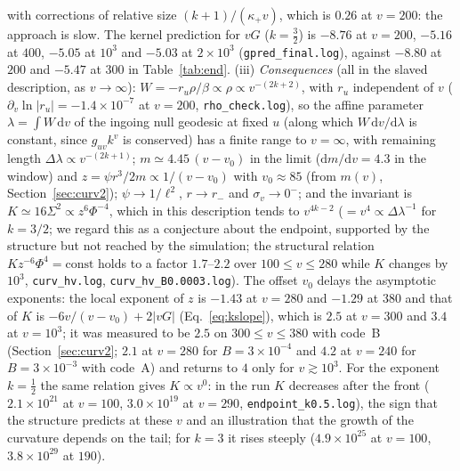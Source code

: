 \documentclass[11pt]{article}
\begin{document}
with corrections of relative size $(k+1)/(\kappa_+v)$, which is $0.26$ at $v=200$: the approach is slow. The kernel prediction for $vG$ ($k=\tfrac32$) is $-8.76$ at $v=200$, $-5.16$ at $400$, $-5.05$ at $10^{3}$ and $-5.03$ at $2\times10^{3}$ (\texttt{gpred\_final.log}), against $-8.80$ at $200$ and $-5.47$ at $300$ in Table~\ref{tab:end}. (iii) \emph{Consequences} (all in the slaved description, as $v\to\infty$): $W=-r_u\rho/\beta\propto\rho\propto v^{-(2k+2)}$, with $r_u$ independent of $v$ ($\partial_v\ln|r_u|=-1.4\times10^{-7}$ at $v=200$, \texttt{rho\_check.log}), so the affine parameter $\lambda=\int W\,\mathrm{d}v$ of the ingoing null geodesic at fixed $u$ (along which $W\,\mathrm{d}v/\mathrm{d}\lambda$ is constant, since $g_{uv}k^{v}$ is conserved) has a finite range to $v=\infty$, with remaining length $\Delta\lambda\propto v^{-(2k+1)}$; $m\simeq4.45\,(v-v_0)$ in the limit ($\mathrm{d}m/\mathrm{d}v=4.3$ in the window) and $z=\psi r^{3}/2m\propto1/(v-v_0)$ with $v_0\approx85$ (from $m(v)$, Section~\ref{sec:curv2}); $\psi\to1/\ell^{2}$, $r\to r_-$ and $\sigma_v\to0^{-}$; and the invariant is $K\simeq16\Sigma^{2}\propto z^{6}\Phi^{-4}$, which in this description tends to $v^{4k-2}$ ($=v^{4}\propto\Delta\lambda^{-1}$ for $k=3/2$; we regard this as a conjecture about the endpoint, supported by the structure but not reached by the simulation; the structural relation $Kz^{-6}\Phi^{4}=\mathrm{const}$ holds to a factor $1.7$--$2.2$ over $100\le v\le280$ while $K$ changes by $10^{3}$, \texttt{curv\_hv.log}, \texttt{curv\_hv\_B0.0003.log}). The offset $v_0$ delays the asymptotic exponents: the local exponent of $z$ is $-1.43$ at $v=280$ and $-1.29$ at $380$ and that of $K$ is $-6v/(v-v_0)+2|vG|$ (Eq.~\eqref{eq:kslope}), which is $2.5$ at $v=300$ and $3.4$ at $v=10^{3}$; it was measured to be $2.5$ on $300\le v\le380$ with code~B (Section~\ref{sec:curv2}; $2.1$ at $v=280$ for $B=3\times10^{-4}$ and $4.2$ at $v=240$ for $B=3\times10^{-3}$ with code~A) and returns to $4$ only for $v\gtrsim10^{3}$. For the exponent $k=\tfrac12$ the same relation gives $K\propto v^{0}$: in the run $K$ decreases after the front ($2.1\times10^{21}$ at $v=100$, $3.0\times10^{19}$ at $v=290$, \texttt{endpoint\_k0.5.log}), the sign that the structure predicts at these $v$ and an illustration that the growth of the curvature depends on the tail; for $k=3$ it rises steeply ($4.9\times10^{25}$ at $v=100$, $3.8\times10^{29}$ at $190$).
\end{document}

